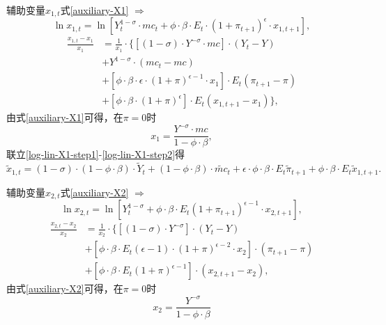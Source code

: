 辅助变量$x_{1,t}$式\eqref{auxiliary-X1} $\Rightarrow$
\begin{equation*}
  \ln x_{1,t} = \ln \left[ Y_t^{1-\sigma} \cdot mc_t + \phi \cdot \beta \cdot E_t \cdot (1+\pi_{t+1})^{\epsilon} \cdot x_{1,t+1}\right],
\end{equation*}
\begin{align}
\label{log-lin-X1-step1}
  \frac{x_{1,t} - x_{1}}{x_1} &= \frac{1}{x_1} \cdot \{ \left[(1-\sigma) \cdot Y^{-\sigma} \cdot mc \right]\cdot (Y_t - Y) \nonumber\\
  &+Y^{1-\sigma} \cdot (mc_t - mc) \nonumber\\
  &+\left[\phi \cdot \beta \cdot \epsilon \cdot (1+\pi)^{\epsilon -1} \cdot x_1\right] \cdot E_t (\pi_{t+1}-\pi)\nonumber\\
  &+\left[ \phi \cdot \beta \cdot (1+\pi)^{\epsilon}\right] \cdot E_t (x_{1,t+1} - x_1) \},
\end{align}
由式\eqref{auxiliary-X1}可得，在$\pi = 0$时
\begin{equation}
\label{log-lin-X1-step2}
  x_{1} = \frac{Y^{-\sigma} \cdot mc}{1-\phi \cdot \beta},
\end{equation}
联立\eqref{log-lin-X1-step1}-\eqref{log-lin-X1-step2}得
\begin{equation}
\label{log-lin-X1-step3}
  \tilde{x}_{1,t} = (1-\sigma) \cdot (1-\phi \cdot \beta) \cdot \tilde{Y}_t + (1-\phi \cdot \beta) \cdot \tilde{mc}_t + \epsilon \cdot \phi \cdot \beta \cdot E_t \tilde{\pi}_{t+1} + \phi \cdot \beta \cdot E_t \tilde{x}_{1,t+1}.
\end{equation}

辅助变量$x_{2,t}$式\eqref{auxiliary-X2} $\Rightarrow$
\begin{equation*}
  \ln x_{2,t} = \ln \left[Y_t^{1-\sigma} + \phi \cdot \beta \cdot E_t \left(1+\pi_{t+1}\right)^{\epsilon -1} \cdot x_{2,t+1}\right],
\end{equation*}
\begin{align}
\label{eq:log-lin-X2-step1}
  \frac{x_{2,t}-x_2}{x_2} &= \frac{1}{x_2} \cdot \{ \left[(1-\sigma) \cdot Y^{-\sigma}\right] \cdot (Y_t - Y)\nonumber\\
                          &+\left[\phi \cdot \beta \cdot E_t (\epsilon -1) \cdot (1+\pi)^{\epsilon -2} \cdot x_2\right] \cdot (\pi_{t+1} - \pi)\nonumber\\
                          &+\left[\phi \cdot \beta \cdot E_t (1+\pi)^{\epsilon -1} \right] \cdot \left( x_{2,t+1} - x_2\right),
\end{align}
由式\eqref{auxiliary-X2}可得，在$\pi = 0$时
\begin{equation}
  \label{eq:log-lin-X2-step2}
  x_2 = \frac{Y^{-\sigma}}{1-\phi \cdot \beta}
\end{equation}

